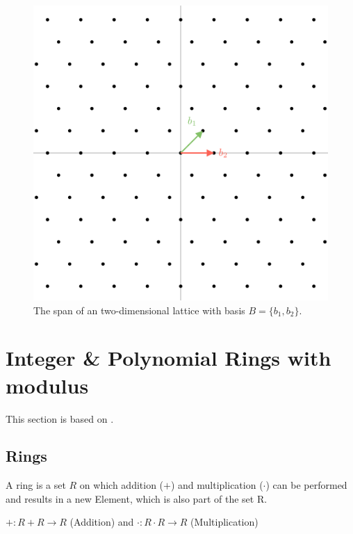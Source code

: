 \begin{figure}[h]
  \centering
  \includegraphics[scale=0.2]{images/LatticeGrid.png}
  \caption[Span of an Lattice]{The span of an two-dimensional lattice with basis  $B = \{b_1, b_2\}$.}
  \label{fig:latticeGrid}
\end{figure}



\section{Integer \& Polynomial Rings with modulus}
This section is based on \cite{Algebra}.

\subsection*{Rings}
A ring is a set $R$ on which addition ($+$) and multiplication ($\cdot$) can be performed and results in a new Element, which is also part of the set R.
\begin{center}
  $ +: R+R\rightarrow R$ (Addition) and $\cdot: R \cdot R \rightarrow R$ (Multiplication)
\end{center}

